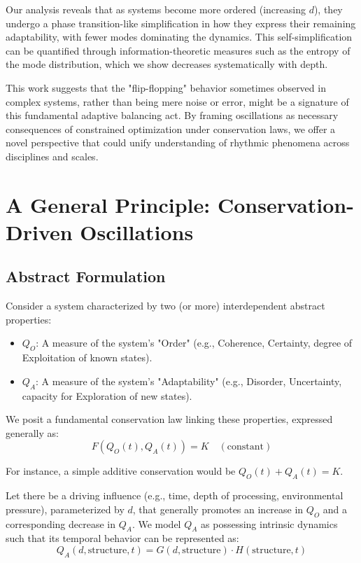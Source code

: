 \documentclass[11pt,a4paper]{article}
\begin{document}
Our analysis reveals that as systems become more ordered (increasing $d$), they undergo a phase transition-like simplification in how they express their remaining adaptability, with fewer modes dominating the dynamics. This self-simplification can be quantified through information-theoretic measures such as the entropy of the mode distribution, which we show decreases systematically with depth.

This work suggests that the "flip-flopping" behavior sometimes observed in complex systems, rather than being mere noise or error, might be a signature of this fundamental adaptive balancing act. By framing oscillations as necessary consequences of constrained optimization under conservation laws, we offer a novel perspective that could unify understanding of rhythmic phenomena across disciplines and scales.

\section{A General Principle: Conservation-Driven Oscillations}

\subsection{Abstract Formulation}

Consider a system characterized by two (or more) interdependent abstract properties:
\begin{itemize}
    \item $Q_O$: A measure of the system's "Order" (e.g., Coherence, Certainty, degree of Exploitation of known states).
    \item $Q_A$: A measure of the system's "Adaptability" (e.g., Disorder, Uncertainty, capacity for Exploration of new states).
\end{itemize}

We posit a fundamental conservation law linking these properties, expressed generally as:
\begin{equation}
    F(Q_O(t), Q_A(t)) = K \quad (\text{constant})
\end{equation}

For instance, a simple additive conservation would be $Q_O(t) + Q_A(t) = K$.

Let there be a driving influence (e.g., time, depth of processing, environmental pressure), parameterized by $d$, that generally promotes an increase in $Q_O$ and a corresponding decrease in $Q_A$. We model $Q_A$ as possessing intrinsic dynamics such that its temporal behavior can be represented as:
\begin{equation}
    Q_A(d, \text{structure}, t) = G(d, \text{structure}) \cdot H(\text{structure}, t)
\end{equation}
\end{document}
